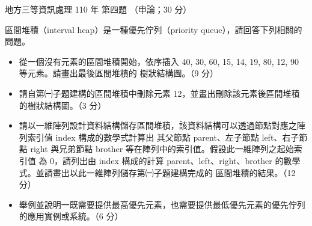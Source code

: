 \begin{pastexam}[label={px:df3-110-ds-04}]{地方三等資訊處理 110 年 第四題}
（申論；30 分）

區間堆積（interval heap）是一種優先佇列（priority queue），請回答下列相關的問題。
\begin{itemize}[leftmargin=2.2em]
\item[㈠] 從一個沒有元素的區間堆積開始，依序插入 40, 30, 60, 15, 14, 19, 80, 12, 90 等元素。請畫出最後區間堆積的
樹狀結構圖。（9 分）
\item[㈡] 請自第㈠子題建構的區間堆積中刪除元素 12，並畫出刪除該元素後區間堆積的樹狀結構圖。（3 分）
\item[㈢] 請以一維陣列設計資料結構儲存區間堆積，該資料結構可以透過節點對應之陣列索引值 index 構成的數學式計算出
其父節點 parent、左子節點 left、右子節點 right 與兄弟節點 brother 等在陣列中的索引值。假設此一維陣列之起始索引值
為 0，請列出由 index 構成的計算 parent、left、right、brother 的數學式。並請畫出以此一維陣列儲存第㈠子題建構完成的
區間堆積的結果。（12 分）
\item[㈣] 舉例並說明一既需要提供最高優先元素，也需要提供最低優先元素的優先佇列的應用實例或系統。（6 分）
\end{itemize}
\end{pastexam}

